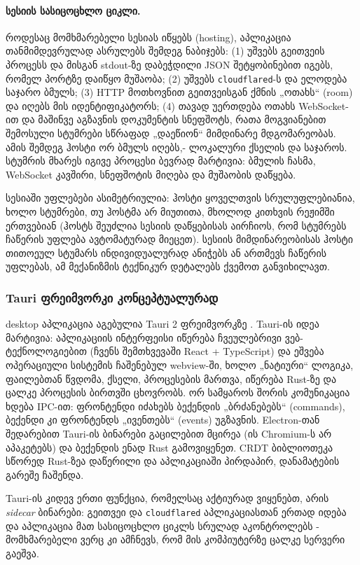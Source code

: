 \paragraph{სესიის სასიცოცხლო ციკლი.}
როდესაც მომხმარებელი სესიას იწყებს (hosting), აპლიკაცია
თანმიმდევრულად ასრულებს შემდეგ ნაბიჯებს: (1) უშვებს გეითვეის პროცესს და
მისგან stdout-ზე დაბეჭდილი JSON შეტყობინებით იგებს,
რომელ პორტზე დაიწყო მუშაობა; (2) უშვებს
\texttt{cloudflared}-ს და ელოდება საჯარო ბმულს; (3) HTTP მოთხოვნით
გეითვეისგან ქმნის „ოთახს“ (room) და იღებს მის იდენტიფიკატორს; (4) თავად
უერთდება ოთახს WebSocket-ით და მაშინვე აგზავნის დოკუმენტის სნეფშოტს, რათა
მოგვიანებით შემოსული სტუმრები სწრაფად „დაეწიონ“ მიმდინარე მდგომარეობას.
ამის შემდეგ ჰოსტი ორ ბმულს იღებს,- ლოკალური ქსელის და საჯაროს.
სტუმრის მხარეს იგივე პროცესი ბევრად
მარტივია: ბმულის ჩასმა, WebSocket კავშირი, სნეფშოტის მიღება და მუშაობის
დაწყება.

სესიაში უფლებები ასიმეტრიულია: ჰოსტი ყოველთვის სრულუფლებიანია, ხოლო
სტუმრები, თუ ჰოსტმა არ მიუთითა, მხოლოდ კითხვის რეჟიმში ერთვებიან (ჰოსტს შეუძლია
სესიის დაწყებისას აირჩიოს, რომ სტუმრებს ჩაწერის უფლება ავტომატურად
მიეცეთ). სესიის მიმდინარეობისას ჰოსტი თითოეულ სტუმარს ინდივიდუალურად
ანიჭებს ან ართმევს ჩაწერის უფლებას, ამ მექანიზმის ტექნიკურ დეტალებს
ქვემოთ განვიხილავთ.

\subsubsection{Tauri ფრეიმვორკი კონცეპტუალურად}

desktop აპლიკაცია აგებულია Tauri 2 ფრეიმვორკზე \cite{tauri}. Tauri-ის
იდეა მარტივია: აპლიკაციის ინტერფეისი იწერება ჩვეულებრივი ვებ-ტექნოლოგიებით
(ჩვენს შემთხვევაში React + TypeScript) და ეშვება ოპერაციული სისტემის
ჩაშენებულ webview-ში, ხოლო „ნატიური“ ლოგიკა, ფაილებთან წვდომა, ქსელი,
პროცესების მართვა, იწერება Rust-ზე და ცალკე პროცესის ბირთვში ცხოვრობს.
ორ სამყაროს შორის კომუნიკაცია ხდება IPC-ით: ფრონტენდი იძახებს ბექენდის
„ბრძანებებს“ (commands), ბექენდი კი ფრონტენდს „ივენთებს“ (events) უგზავნის.
Electron-თან შედარებით Tauri-ის ბინარები გაცილებით მცირეა (ის Chromium-ს
არ აპაკეტებს) და ბექენდის ენად Rust გამოვიყენეთ.
CRDT ბიბლიოთეკა სწორედ Rust-ზეა დაწერილი და აპლიკაციაში პირდაპირ,
დანამატების გარეშე ჩაშენდა.

Tauri-ის კიდევ ერთი ფუნქცია, რომელსაც აქტიურად ვიყენებთ, არის
\emph{sidecar} ბინარები: გეითვეი და \texttt{cloudflared} აპლიკაციასთან
ერთად იდება და აპლიკაცია მათ სასიცოცხლო ციკლს სრულად აკონტროლებს -
მომხმარებელი ვერც კი ამჩნევს, რომ მის კომპიუტერზე ცალკე სერვერი გაეშვა.

